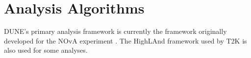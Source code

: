 \documentclass[../main-v1.tex]{subfiles}
\begin{document}
\section{Analysis Algorithms }
\label{sec:algo:an}

DUNE's primary analysis framework is currently   the  framework originally developed for the NOvA experiment \cite{Backhouse:2015wlj,  bib:cafana}. The HighLAnd framework used by T2K is also used for some analyses. 
\end{document}
